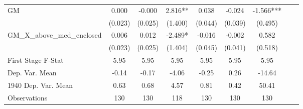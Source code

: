 \begin{tabular}{l*{8}{c}}
\cmidrule(lr){1-7}
GM              &    0.000   &   -0.000   &    2.816** &    0.038   &   -0.024   &   -1.566***\\
                &  (0.023)   &  (0.025)   &  (1.400)   &  (0.044)   &  (0.039)   &  (0.495)   \\
\addlinespace
GM\_X\_above\_med\_enclosed&    0.006   &    0.012   &   -2.489*  &   -0.016   &   -0.002   &    0.582   \\
                &  (0.023)   &  (0.025)   &  (1.404)   &  (0.045)   &  (0.041)   &  (0.518)   \\
\midrule
First Stage F-Stat&     5.95   &     5.95   &     5.95   &     5.95   &     5.95   &     5.95   \\
Dep. Var. Mean  &    -0.14   &    -0.17   &    -4.06   &    -0.25   &     0.26   &   -14.64   \\
1940 Dep. Var. Mean&     0.63   &     0.68   &     4.57   &     0.81   &     0.42   &    50.41   \\
Observations    &      130   &      130   &      118   &      130   &      130   &      130   \\
       \bottomrule \end{tabular}
